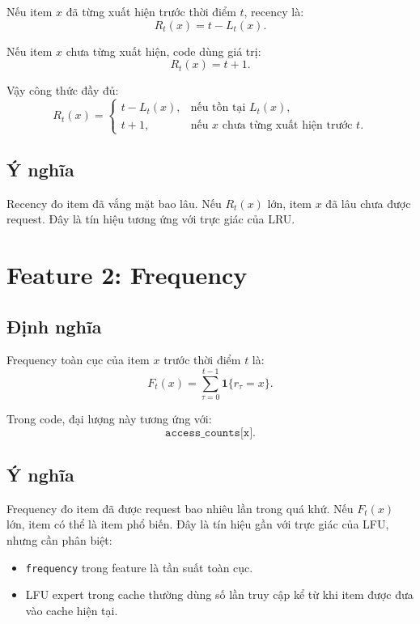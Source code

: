 \documentclass[11pt,a4paper]{article}
\newcommand{\code}[1]{\texttt{#1}}
\newcommand{\ind}[1]{\mathbf{1}\{#1\}}
\begin{document}
Nếu item \(x\) đã từng xuất hiện trước thời điểm \(t\), recency là:
\[
    R_t(x) = t - L_t(x).
\]

Nếu item \(x\) chưa từng xuất hiện, code dùng giá trị:
\[
    R_t(x) = t + 1.
\]

Vậy công thức đầy đủ:
\[
    R_t(x)
    =
    \begin{cases}
        t - L_t(x), & \text{nếu tồn tại } L_t(x),\\
        t + 1, & \text{nếu } x \text{ chưa từng xuất hiện trước } t.
    \end{cases}
\]

\subsection{Ý nghĩa}

Recency đo item đã vắng mặt bao lâu. Nếu \(R_t(x)\) lớn, item \(x\) đã lâu chưa được request. Đây là tín hiệu tương ứng với trực giác của LRU.

\section{Feature 2: Frequency}

\subsection{Định nghĩa}

Frequency toàn cục của item \(x\) trước thời điểm \(t\) là:
\[
    F_t(x)
    =
    \sum_{\tau=0}^{t-1}
    \ind{r_{\tau}=x}.
\]

Trong code, đại lượng này tương ứng với:
\[
    \code{access\_counts[x]}.
\]

\subsection{Ý nghĩa}

Frequency đo item đã được request bao nhiêu lần trong quá khứ. Nếu \(F_t(x)\) lớn, item có thể là item phổ biến. Đây là tín hiệu gần với trực giác của LFU, nhưng cần phân biệt:

\begin{itemize}[leftmargin=1.4em]
    \item \code{frequency} trong feature là tần suất toàn cục.
    \item LFU expert trong cache thường dùng số lần truy cập kể từ khi item được đưa vào cache hiện tại.
\end{itemize}
\end{document}
